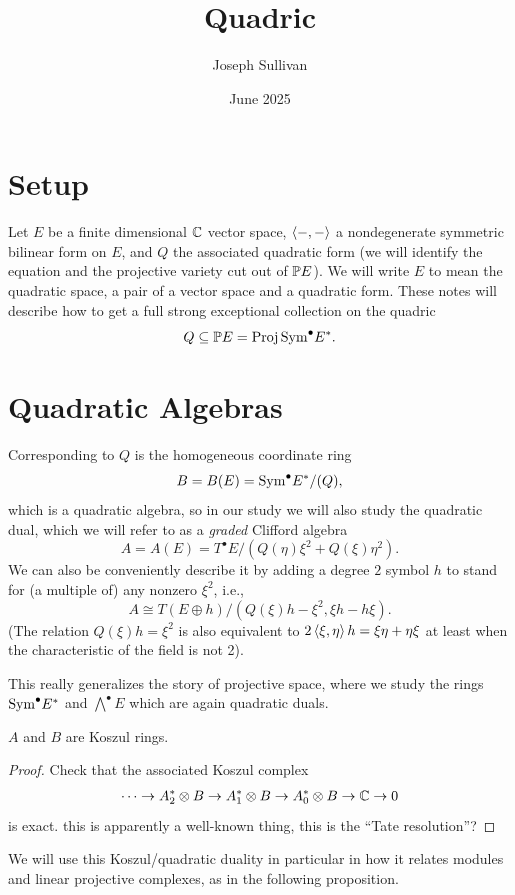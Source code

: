 \documentclass[12pt]{article}
\title{Quadric}
\author{Joseph Sullivan}
\date{June 2025}
\begin{document}
\maketitle
\tableofcontents

\section{Setup}

Let $E$ be a finite dimensional $\C$ vector space, $\<-,-\>$ a nondegenerate symmetric bilinear form on $E$, and $Q$ the associated quadratic form (we will identify the equation and the projective variety cut out of $\P E$). We will write $E$ to mean the quadratic space, a pair of a vector space and a quadratic form. These notes will describe how to get a full strong exceptional collection on the quadric
\[Q\subseteq \P E = \Proj \Sym^\bullet E^*.\]


\section{Quadratic Algebras}

Corresponding to $Q$ is the homogeneous coordinate ring
\[B = B(E) = \Sym^\bullet E^*/(Q),\]
which is a quadratic algebra, so in our study we will also study the quadratic dual, which we will refer to as a \textit{graded} Clifford algebra
\[A = A(E) = T^\bullet E/(Q(\eta)\xi^2 + Q(\xi)\eta^2).\]
We can also be conveniently describe it by adding a degree $2$ symbol $h$ to stand for (a multiple of) any nonzero $\xi^2$, i.e.,
\[A \cong T(E\oplus h)/(Q(\xi) h - \xi^2, \xi h - h\xi).\]
(The relation $Q(\xi)h=\xi^2$ is also equivalent to $2\<\xi,\eta\>h = \xi \eta + \eta \xi$ at least when the characteristic of the field is not 2).

This really generalizes the story of projective space, where we study the rings $\Sym^\bullet E^*$ and $\bigwedge^\bullet E$ which are again quadratic duals.

\begin{prop}
    $A$ and $B$ are Koszul rings.
\end{prop}
\begin{proof}
    Check that the associated Koszul complex
    \[\cdots \to A_2^* \otimes B \to A_1^* \otimes B \to A_0^* \otimes B \to \C \to 0\]
    is exact. {\color{red} this is apparently a well-known thing, this is the ``Tate resolution''?}
\end{proof}

We will use this Koszul/quadratic duality in particular in how it relates modules and linear projective complexes, as in the following proposition.
\end{document}
